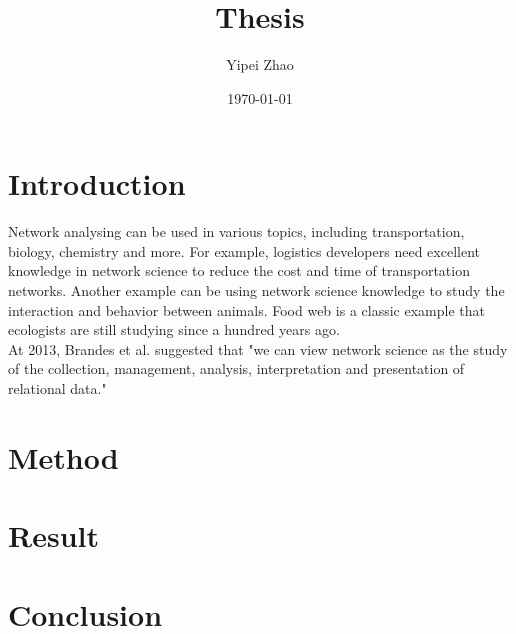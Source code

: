 \documentclass{article}
\title{Thesis}
\author{Yipei Zhao}
\date{\today}
\begin{document}
\maketitle

\section{Introduction}
Network analysing can be used in various topics, including transportation, biology, chemistry and more.
For example, logistics developers need excellent knowledge in network science to reduce the cost and time of transportation networks.
Another example can be using network science knowledge to study the interaction and behavior between animals. Food web is a classic example that ecologists are still studying since a hundred years ago.
\\
At 2013, Brandes et al. \cite{brandes_robins_mccranie_wasserman_2013} suggested that "we can view network science as the study of the collection, management, analysis, interpretation and presentation of relational data."
\section{Method}

\section{Result}

\section{Conclusion}

\printbibliography
\end{document}

